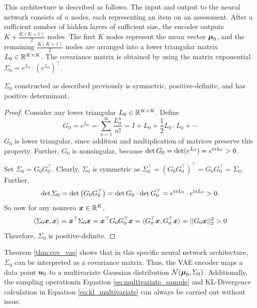 This architecture is described as follows. The input and output to the neural network consists of $n$ nodes, each representing an item on an assessment. After a sufficient number of hidden layers of sufficient size, the encoder outputs $K + \frac{K(K+1)}{2}$ nodes. The first $K$ nodes represent the mean vector $\boldsymbol{\mu}_0$, and the remaining $\frac{K(K+1)}{2}$ nodes are arranged into a lower triangular matrix $L_0 \in \mathbb{R}^{K\times K}$. The covariance matrix is obtained by using the matrix exponential $\Sigma_0 = e^{L_0} \cdot \left( e^{L_0} \right)^\top$.

\begin{theorem}
  $\Sigma_0$ constructed as described previously is symmetric, positive-definite, and has positive determinant.
  \label{thm:cov_vae}
\end{theorem}
\begin{proof}
  Consider any lower triangular $L_0 \in \mathbb{R}^{K\times K}$. Define 
  \[G_0 = e^{L_0} = \sum_{n=1}^\infty \frac{L_0^n}{n!} = I + L_0 + \frac{1}{2} L_0 \cdot L_0 + \cdots\]
  $G_0$ is lower triangular, since addition and multiplication of matrices preserve this property. Further, $G_0$ is nonsingular, because $\det G_0 = \det(e^{L_0}) = e^{\text{tr} L_0} > 0$.

  Set $\Sigma_0 = G_0 G_0^\top$. Clearly, $\Sigma_0$ is symmetric as $\Sigma_0^\top = (G_0 G_0^\top)^\top = G_0 G_0^\top = \Sigma_0$. Further, 
  \[\det \Sigma_0 = \det \left(G_0 G_0^\top \right) = \det G_0 \cdot \det G_0^\top = e^{\text{tr} L_0} \cdot e^{\text{tr} L_0} > 0.\]
So now for any nonzero $\boldsymbol{x} \in \mathbb{R}^K$,
  \[\langle \Sigma_0 \boldsymbol{x}, \boldsymbol{x} \rangle = \boldsymbol{x}^\top \Sigma_0 \boldsymbol{x} = \boldsymbol{x}^\top G_0 G_0^\top \boldsymbol{x} = \langle G_0^\top \boldsymbol{x}, G_0^\top \boldsymbol{x} \rangle = ||G_0 \boldsymbol{x}||_2^2 > 0\]
  Therefore, $\Sigma_0$ is positive-definite.
\end{proof}

Theorem \ref{thm:cov_vae} shows that in this specific neural network architecture, $\Sigma_0$ can be interpreted as a covariance matrix. Thus, the VAE encoder maps a data point $\boldsymbol{u}_0$ to a multivariate Gaussian distribution $\mathcal{N}(\boldsymbol{\mu}_0, \Sigma_0)$. Additionally, the sampling operationin Equation \ref{eq:multivariate_sample} and KL-Divergence calculation in Equation \ref{eq:kl_multivariate} can always be carried out without issue.

